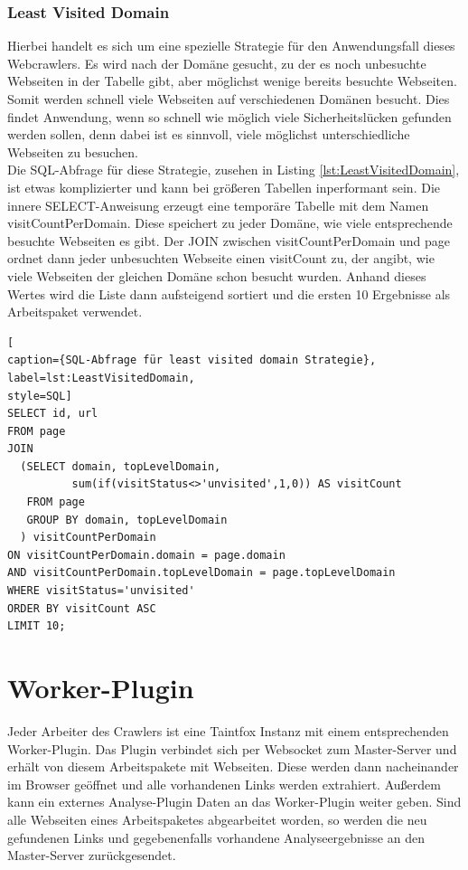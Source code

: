 \subsubsection{Least Visited Domain}
Hierbei handelt es sich um eine spezielle Strategie für den Anwendungsfall dieses Webcrawlers. Es wird nach der Domäne gesucht, zu der es noch unbesuchte Webseiten in der Tabelle gibt, aber möglichst wenige bereits besuchte Webseiten. Somit werden schnell viele Webseiten auf verschiedenen Domänen besucht. Dies findet Anwendung, wenn so schnell wie möglich viele Sicherheitslücken gefunden werden sollen, denn dabei ist es sinnvoll, viele möglichst unterschiedliche Webseiten zu besuchen. \\
Die SQL-Abfrage für diese Strategie, zusehen in Listing \ref{lst:LeastVisitedDomain}, ist etwas komplizierter und kann bei größeren Tabellen inperformant sein. Die innere SELECT-Anweisung erzeugt eine temporäre Tabelle mit dem Namen visitCountPerDomain. Diese speichert zu jeder Domäne, wie viele entsprechende besuchte Webseiten es gibt. Der JOIN zwischen visitCountPerDomain und page ordnet dann jeder unbesuchten Webseite einen visitCount zu, der angibt, wie viele Webseiten der gleichen Domäne schon besucht wurden. Anhand dieses Wertes wird die Liste dann aufsteigend sortiert und die ersten 10 Ergebnisse als Arbeitspaket verwendet.

\begin{lstlisting}[
caption={SQL-Abfrage für least visited domain Strategie},
label=lst:LeastVisitedDomain,
style=SQL]
SELECT id, url
FROM page
JOIN
  (SELECT domain, topLevelDomain,
          sum(if(visitStatus<>'unvisited',1,0)) AS visitCount
   FROM page
   GROUP BY domain, topLevelDomain
  ) visitCountPerDomain
ON visitCountPerDomain.domain = page.domain
AND visitCountPerDomain.topLevelDomain = page.topLevelDomain
WHERE visitStatus='unvisited'
ORDER BY visitCount ASC
LIMIT 10;
\end{lstlisting}

\section{Worker-Plugin}
Jeder Arbeiter des Crawlers ist eine Taintfox Instanz mit einem entsprechenden Worker-Plugin. Das Plugin verbindet sich per Websocket zum Master-Server und erhält von diesem Arbeitspakete mit Webseiten. Diese werden dann nacheinander im Browser geöffnet und alle vorhandenen Links werden extrahiert. Außerdem kann ein externes Analyse-Plugin Daten an das Worker-Plugin weiter geben. Sind alle Webseiten eines Arbeitspaketes abgearbeitet worden, so werden die neu gefundenen Links und gegebenenfalls vorhandene Analyseergebnisse an den Master-Server zurückgesendet.
